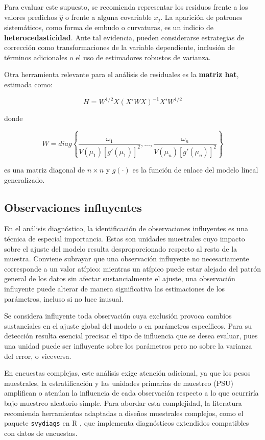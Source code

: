 \documentclass[
  spanish,
  12pt,
]{book}
\begin{document}
Para evaluar este supuesto, se recomienda representar los residuos frente a los valores predichos \(\hat{y}\) o frente a alguna covariable \(x_j\). La aparición de patrones sistemáticos, como forma de embudo o curvaturas, es un indicio de \textbf{heterocedasticidad}. Ante tal evidencia, pueden considerarse estrategias de corrección como transformaciones de la variable dependiente, inclusión de términos adicionales o el uso de estimadores robustos de varianza.

Otra herramienta relevante para el análisis de residuales es la \textbf{matriz hat}, estimada como:

\[
H  =  W^{1/2}X\left(X'WX\right)^{-1}X'W^{1/2}
\]

donde

\[
W  =  diag\left\{ \frac{\omega_{1}}{V\left(\mu_{1}\right)\left[g'\left(\mu_{1}\right)\right]^{2}},...,\frac{\omega_{n}}{V\left(\mu_{n}\right)\left[g'\left(\mu_{n}\right)\right]^{2}}\right\}
\]

es una matriz diagonal de \(n\times n\) y \(g(\cdot)\) es la función de enlace del modelo lineal generalizado.

\subsection{Observaciones influyentes}\label{observaciones-influyentes}

En el análisis diagnóstico, la identificación de observaciones influyentes es una técnica de especial importancia. Estas son unidades muestrales cuyo impacto sobre el ajuste del modelo resulta desproporcionado respecto al resto de la muestra. Conviene subrayar que una observación influyente no necesariamente corresponde a un valor atípico: mientras un atípico puede estar alejado del patrón general de los datos sin afectar sustancialmente el ajuste, una observación influyente puede alterar de manera significativa las estimaciones de los parámetros, incluso si no luce inusual.

Se considera influyente toda observación cuya exclusión provoca cambios sustanciales en el ajuste global del modelo o en parámetros específicos. Para su detección resulta esencial precisar el tipo de influencia que se desea evaluar, pues una unidad puede ser influyente sobre los parámetros pero no sobre la varianza del error, o viceversa.

En encuestas complejas, este análisis exige atención adicional, ya que los pesos muestrales, la estratificación y las unidades primarias de muestreo (PSU) amplifican o atenúan la influencia de cada observación respecto a lo que ocurriría bajo muestreo aleatorio simple. Para abordar esta complejidad, la literatura recomienda herramientas adaptadas a diseños muestrales complejos, como el paquete \texttt{svydiags} en R \citep[véase][]{Valliant2024}, que implementa diagnósticos extendidos compatibles con datos de encuestas.
\end{document}
